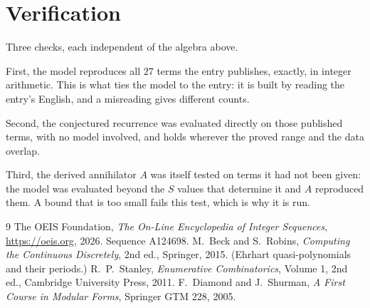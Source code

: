 \documentclass[11pt,a4paper]{article}
\theoremstyle{plain}
\theoremstyle{definition}
\begin{document}
\section{Verification}

Three checks, each independent of the algebra above.

First, the model reproduces all $27$ terms the entry publishes, exactly, in integer
arithmetic. This is what ties the model to the entry: it is built by reading the entry's
English, and a misreading gives different counts.

Second, the conjectured recurrence was evaluated directly on those published terms, with no
model involved, and holds wherever the proved range and the data overlap.

Third, the derived annihilator $A$ was itself tested on terms it had not been given: the model
was evaluated beyond the $S$ values that determine it and $A$ reproduced them. A bound that is
too small fails this test, which is why it is run.

\begin{thebibliography}{9}
 The OEIS Foundation, \emph{The On-Line Encyclopedia of Integer
Sequences}, \url{https://oeis.org}, 2026. Sequence A124698.
 M.~Beck and S.~Robins, \emph{Computing the Continuous Discretely},
2nd ed., Springer, 2015. (Ehrhart quasi-polynomials and their periods.)
 R.~P.~Stanley, \emph{Enumerative Combinatorics}, Volume 1, 2nd ed.,
Cambridge University Press, 2011.
 F.~Diamond and J.~Shurman, \emph{A First Course in Modular Forms},
Springer GTM 228, 2005.
\end{thebibliography}
\end{document}
